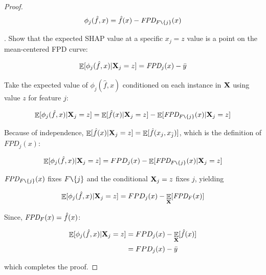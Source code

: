 \documentclass[11pt]{article}
\DeclareMathOperator{\Ex}{\mathbb{E}}
\begin{document}
\begin{proof}
\[
\phi_j(\hat{f},x) = \hat{f}(x) - \text{\it FPD}_{F \texttt{\char`\\} \{j\}}(x)
\]

. Show that the expected SHAP value at a specific $x_j=z$ value is a point on the mean-centered FPD curve:


\[
\Ex[ \phi_j(\hat{f},x) | {\bf X}_j = z] = \text{\it FPD}_j(x) - \bar{y}
\]

\noindent Take the expected value of $\phi_j(\hat{f},x)$ conditioned on each instance in $\bf X$ using value $z$ for feature $j$:

\[
\Ex[ \phi_j(\hat{f},x) | {\bf X}_j = z ] = \Ex [\hat{f}(x) | {\bf X}_j = z ] - \Ex [ \text{\it FPD}_{F \texttt{\char`\\} \{j\}}(x) | {\bf X}_j = z ]
\]

\noindent  Because of independence, $\Ex [\hat{f}(x) | {\bf X}_j = z ] = \Ex [\hat{f}(x_j,x_{\bar{j}}) ]$, which is the definition of $FPD_j(x)$:

\[
\Ex[ \phi_j(\hat{f},x) | {\bf X}_j = z ] = FPD_j(x) - \Ex [ \text{\it FPD}_{F \texttt{\char`\\} \{j\}}(x) | {\bf X}_j = z ]
\]

\noindent $\text{\it FPD}_{F \texttt{\char`\\} \{j\}}(x)$  fixes $F \texttt{\char`\\} \{j\}$ and the conditional ${\bf X}_j = z$ fixes $j$, yielding 

\[
\Ex[ \phi_j(\hat{f},x) | {\bf X}_j = z ] = FPD_j(x) - \Ex_{\bf X} [ \text{\it FPD}_{F}(x) ]
\]

\noindent Since, $\text{\it FPD}_{F}(x) = \hat{f}(x)$:

\[
\begin{split}
\Ex[ \phi_j(\hat{f},x) | {\bf X}_j = z ] &= FPD_j(x) - \Ex_{\bf X} [ \hat{f}(x) ]\\
 & = FPD_j(x) - \bar{y}
\end{split}
\]

\noindent which completes the proof.

\end{proof}
\end{document}
